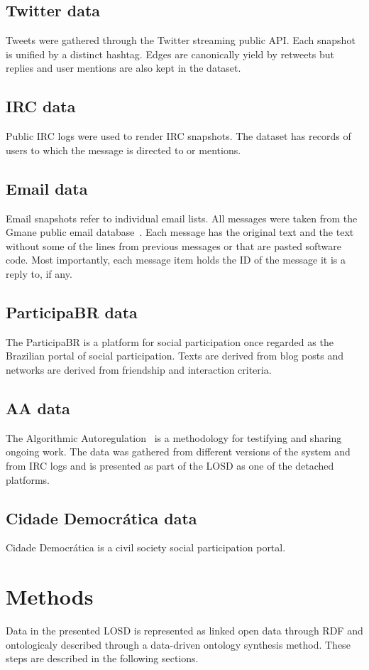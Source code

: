 \documentclass[review]{elsarticle}
\begin{document}
\subsection{Twitter data}
Tweets were gathered through the Twitter streaming public API.
Each snapshot is unified by a distinct hashtag.
Edges are canonically yield by retweets but replies and user mentions
are also kept in the dataset.

\subsection{IRC data}
Public IRC logs were used to render IRC snapshots.
The dataset has records of users to which the message is directed to or
mentions.

\subsection{Email data}
Email snapshots refer to individual email lists.
All messages were taken from the Gmane public email database~\cite{gmane}.
Each message has the original text and the text without some of the lines
from previous messages or that are pasted software code.
Most importantly, each message item holds the ID of the message it is
a reply to, if any.

\subsection{ParticipaBR data}
The ParticipaBR is a platform for social participation once regarded as
the Brazilian portal of social participation.
Texts are derived from blog posts and networks are derived from
friendship and interaction criteria.

\subsection{AA data}
The Algorithmic Autoregulation~\cite{aa} is a methodology for testifying
and sharing ongoing work.
The data was gathered from different versions of the system and from IRC
logs and is presented as part of the LOSD as one of the detached
platforms.

\subsection{Cidade Democr\'atica data}
Cidade Democr\'atica is a civil society social participation portal.

\section{Methods}
Data in the presented LOSD is represented as linked open data through
RDF and ontologicaly described through a data-driven ontology synthesis
method.
These steps are described in the following sections.
\end{document}
